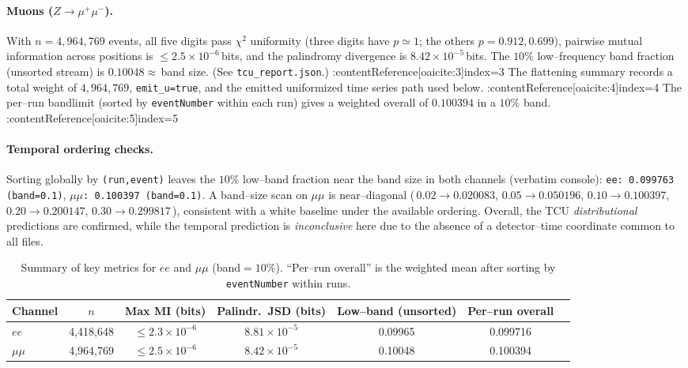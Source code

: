 \documentclass[11pt]{article}
\begin{document}
\paragraph{Muons ($Z\!\to\!\mu^+\mu^-$).}
With $n=4{,}964{,}769$ events, all five digits pass $\chi^2$ uniformity (three digits have $p\simeq 1$; the others $p=0.912,0.699$), pairwise mutual information across positions is $\le 2.5\times 10^{-6}$\,bits, and the palindromy divergence is $8.42\times 10^{-5}$\,bits. The $10\%$ low–frequency band fraction (unsorted stream) is $0.10048\approx$\,band size. (See \texttt{tcu\_report.json}.) :contentReference[oaicite:3]{index=3}
The flattening summary records a total weight of $4{,}964{,}769$, \texttt{emit\_u=true}, and the emitted uniformized time series path used below. :contentReference[oaicite:4]{index=4}
The per–run bandlimit (sorted by \texttt{eventNumber} within each run) gives a weighted overall of $0.100394$ in a $10\%$ band. :contentReference[oaicite:5]{index=5}

\paragraph{Temporal ordering checks.}
Sorting globally by \texttt{(run,event)} leaves the $10\%$ low–band fraction near the band size in both channels (verbatim console): 
\texttt{ee: 0.099763 (band=0.1)}, \texttt{$\mu\mu$: 0.100397 (band=0.1)}.
A band–size scan on $\mu\mu$ is near–diagonal (\,$0.02 \!\to\! 0.020083$, $0.05 \!\to\! 0.050196$, $0.10 \!\to\! 0.100397$, $0.20 \!\to\! 0.200147$, $0.30 \!\to\! 0.299817$\,), consistent with a white baseline under the available ordering.
Overall, the TCU \emph{distributional} predictions are confirmed, while the temporal prediction is \emph{inconclusive} here due to the absence of a detector–time coordinate common to all files. 

\begin{table}[t]
\centering
\caption{Summary of key metrics for $ee$ and $\mu\mu$ (band$=10\%$). ``Per–run overall'' is the weighted mean after sorting by \texttt{eventNumber} within runs.}
\label{tab:atlas-summary}
\begin{tabular}{lcccccc}
\toprule
Channel & $n$ & Max MI (bits) & Palindr.\ JSD (bits) & Low–band (unsorted) & Per–run overall \\
\midrule
$ee$   & 4{,}418{,}648 & $\le 2.3\times 10^{-6}$ & $8.81\times 10^{-5}$ & 0.09965 & 0.099716 \\
$\mu\mu$ & 4{,}964{,}769 & $\le 2.5\times 10^{-6}$ & $8.42\times 10^{-5}$ & 0.10048 & 0.100394 \\
\bottomrule
\end{tabular}
\end{table}
\end{document}
